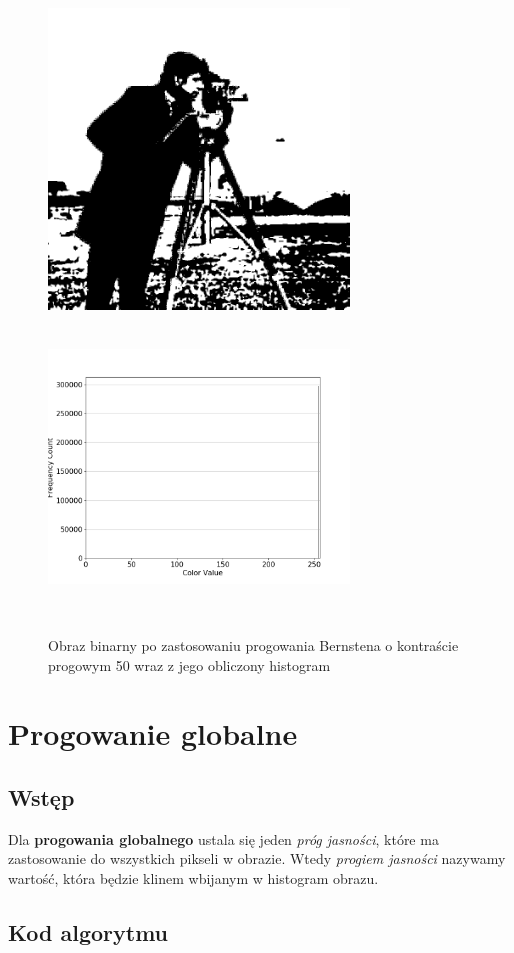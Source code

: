 \documentclass[a4paper,12pt]{book}
\begin{document}
\begin{figure}[H]
	\caption{Obraz binarny po zastosowaniu progowania Bernstena o kontraście progowym 50 wraz z jego obliczony histogram}
	\includegraphics[width=8cm, height=8cm]{5-4/local-threshold-image-photoman-50.png}
	\includegraphics[width=8cm, height=8cm]{5-4/local-threshold-photoman-50.png}
\end{figure}

\section{Progowanie globalne}
\subsection*{Wstęp}
Dla \textbf{progowania globalnego} ustala się jeden \textit{próg jasności}, które ma zastosowanie do wszystkich pikseli w obrazie. Wtedy \textit{progiem jasności} nazywamy wartość, która będzie klinem wbijanym w histogram obrazu. 

\subsection*{Kod algorytmu}
\end{document}
